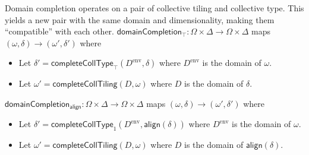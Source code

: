 Domain completion operates on a pair of collective tiling and collective type.
This yields a new pair with the same domain and dimensionality, making them ``compatible'' with each other.
\filbreak
$\mathsf{domainCompletion_\top} : \Omega \times \Delta \to \Omega \times \Delta$
maps $(\omega, \delta) \to (\omega', \delta')$ where
\begin{itemize}
  \item Let $\delta' = \mathsf{completeCollType}_\top(D^\text{env}, \delta)$
    where $D^\text{env}$ is the domain of $\omega$.
  \filbreak
  \item Let $\omega' = \mathsf{completeCollTiling}(D, \omega)$
    where $D$ is the domain of $\delta$.
\end{itemize}
\filbreak
$\mathsf{domainCompletion_{align}} : \Omega \times \Delta \to \Omega \times \Delta$
maps $(\omega, \delta) \to (\omega', \delta')$ where
\begin{itemize}
  \item Let $\delta' = \mathsf{completeCollType}_1(D^\text{env}, \mathsf{align}(\delta))$
    where $D^\text{env}$ is the domain of $\omega$.
  \filbreak
  \item Let $\omega' = \mathsf{completeCollTiling}(D, \omega)$
    where $D$ is the domain of $\mathsf{align}(\delta)$.
\end{itemize}

\filbreak
{}

